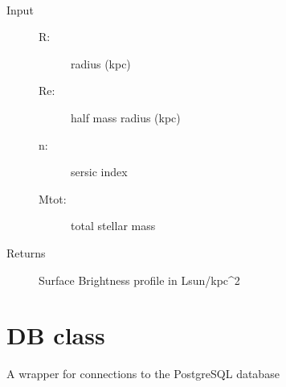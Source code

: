 \documentclass[letterpaper,10pt,english]{sphinxmanual}
\begin{document}

\begin{fulllineitems}
\label{\detokenize{utilities:galaxy.utilities.sersic}}~\begin{description}
\item[{Input}] \leavevmode\begin{description}
\item[{R:}] \leavevmode
radius (kpc)

\item[{Re:}] \leavevmode
half mass radius (kpc)

\item[{n:}] \leavevmode
sersic index

\item[{Mtot:}] \leavevmode
total stellar mass

\end{description}

\item[{Returns}] \leavevmode
Surface Brightness profile in Lsun/kpc\textasciicircum{}2

\end{description}

\end{fulllineitems}

\label{\detokenize{db:module-galaxy.db}}

\chapter{DB class}
\label{\detokenize{db:db-class}}\label{\detokenize{db::doc}}
A wrapper for connections to the PostgreSQL database
\end{document}

